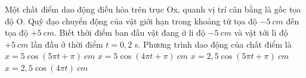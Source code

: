 \begin{ex} %
Một chất điểm dao động điều hòa trên trục Ox, quanh vị trí cân bằng là gốc tọa độ O. Quỹ đạo chuyển động của vật giới hạn trong khoảng từ tọa độ $- 5\ cm$ đến tọa độ $+5\ cm$. Biết thời điểm ban đầu vật đang ở li độ $- 5\ cm$ và vật tới li độ $+ 5\ cm$ lần đầu ở thời điểm $t = 0,2$ s. Phương trình dao động của chất điểm là
\choice
{\True $x=5\cos\left(5\pi t + \pi \right)\ cm$}
{$x=5\cos\left(4\pi t + \pi \right)\ cm$}
{$x=2,5\cos\left(5\pi t + \pi \right)\ cm$}
{$x=2,5\cos\left(4\pi t\right)\ cm$}
\end{ex} 





